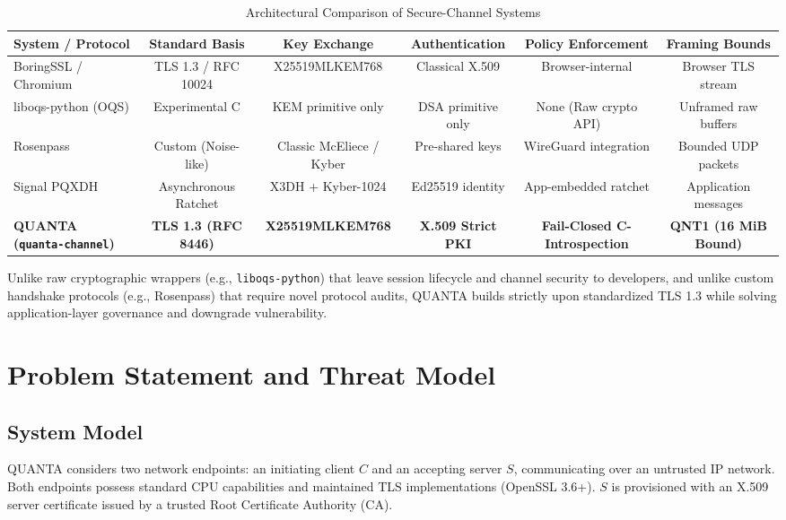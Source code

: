 \documentclass[conference]{IEEEtran}
\begin{document}
\begin{table}[t]
\caption{Architectural Comparison of Secure-Channel Systems}
\label{tab:comparison}
\centering
\begin{tabular}{@{}lccccc@{}}
\toprule
\textbf{System / Protocol} & \textbf{Standard Basis} & \textbf{Key Exchange} & \textbf{Authentication} & \textbf{Policy Enforcement} & \textbf{Framing Bounds} \\
\midrule
BoringSSL / Chromium \cite{paquin2020benchmarking} & TLS 1.3 / RFC 10024 & X25519MLKEM768 & Classical X.509 & Browser-internal & Browser TLS stream \\
liboqs-python (OQS) \cite{paquin2020benchmarking} & Experimental C & KEM primitive only & DSA primitive only & None (Raw crypto API) & Unframed raw buffers \\
Rosenpass \cite{alwen2021post} & Custom (Noise-like) & Classic McEliece / Kyber & Pre-shared keys & WireGuard integration & Bounded UDP packets \\
Signal PQXDH \cite{alwen2021post} & Asynchronous Ratchet & X3DH + Kyber-1024 & Ed25519 identity & App-embedded ratchet & Application messages \\
\textbf{QUANTA (\texttt{quanta-channel})} & \textbf{TLS 1.3 (RFC 8446)} & \textbf{X25519MLKEM768} & \textbf{X.509 Strict PKI} & \textbf{Fail-Closed C-Introspection} & \textbf{QNT1 (16 MiB Bound)} \\
\bottomrule
\end{tabular}
\end{table}

Unlike raw cryptographic wrappers (e.g., \texttt{liboqs-python}) that leave session lifecycle and channel security to developers, and unlike custom handshake protocols (e.g., Rosenpass) that require novel protocol audits, QUANTA builds strictly upon standardized TLS 1.3 while solving application-layer governance and downgrade vulnerability.

\section{Problem Statement and Threat Model}

\subsection{System Model}
QUANTA considers two network endpoints: an initiating client $C$ and an accepting server $S$, communicating over an untrusted IP network. Both endpoints possess standard CPU capabilities and maintained TLS implementations (OpenSSL 3.6+). $S$ is provisioned with an X.509 server certificate issued by a trusted Root Certificate Authority (CA).
\end{document}

